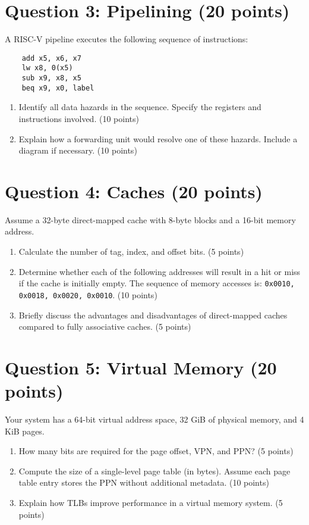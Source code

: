 \documentclass[11pt]{article}
\begin{document}
\section*{Question 3: Pipelining (20 points)}
A RISC-V pipeline executes the following sequence of instructions:
\begin{verbatim}
    add x5, x6, x7
    lw x8, 0(x5)
    sub x9, x8, x5
    beq x9, x0, label
\end{verbatim}
\begin{enumerate}[label=\textbf{Q3.\arabic*}]
    \item Identify all data hazards in the sequence. Specify the registers and instructions involved. (10 points)
    \item Explain how a forwarding unit would resolve one of these hazards. Include a diagram if necessary. (10 points)
\end{enumerate}

\section*{Question 4: Caches (20 points)}
Assume a 32-byte direct-mapped cache with 8-byte blocks and a 16-bit memory address.
\begin{enumerate}[label=\textbf{Q4.\arabic*}]
    \item Calculate the number of tag, index, and offset bits. (5 points)
    \item Determine whether each of the following addresses will result in a hit or miss if the cache is initially empty. The sequence of memory accesses is: \texttt{0x0010, 0x0018, 0x0020, 0x0010}. (10 points)
    \item Briefly discuss the advantages and disadvantages of direct-mapped caches compared to fully associative caches. (5 points)
\end{enumerate}

\section*{Question 5: Virtual Memory (20 points)}
Your system has a 64-bit virtual address space, 32 GiB of physical memory, and 4 KiB pages.
\begin{enumerate}[label=\textbf{Q5.\arabic*}]
    \item How many bits are required for the page offset, VPN, and PPN? (5 points)
    \item Compute the size of a single-level page table (in bytes). Assume each page table entry stores the PPN without additional metadata. (10 points)
    \item Explain how TLBs improve performance in a virtual memory system. (5 points)
\end{enumerate}
\end{document}
